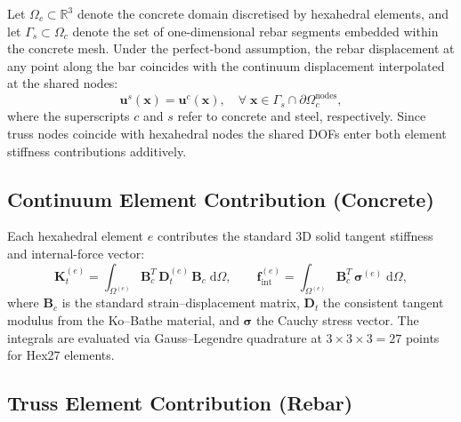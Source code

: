 Let $\Omega_c \subset \mathbb{R}^3$ denote the concrete domain
discretised by hexahedral elements, and let $\Gamma_s \subset \Omega_c$
denote the set of one-dimensional rebar segments embedded within the
concrete mesh.  Under the perfect-bond assumption, the rebar
displacement at any point along the bar coincides with the continuum
displacement interpolated at the shared nodes:
\begin{equation}
  \label{eq:perfect-bond}
  \mathbf{u}^s(\mathbf{x}) = \mathbf{u}^c(\mathbf{x}), \quad
  \forall\; \mathbf{x} \in \Gamma_s \cap \partial\Omega_c^{\text{nodes}},
\end{equation}
where the superscripts $c$ and $s$ refer to concrete and steel,
respectively.  Since truss nodes coincide with hexahedral nodes the
shared DOFs enter both element stiffness contributions additively.

\subsection{Continuum Element Contribution (Concrete)}

Each hexahedral element $e$ contributes the standard 3D solid tangent
stiffness and internal-force vector:
\begin{equation}
  \label{eq:hex-Kt}
  \mathbf{K}_t^{(e)} = \int_{\Omega^{(e)}}
    \mathbf{B}_c^T \, \mathbf{D}_t^{(e)} \, \mathbf{B}_c \; \mathrm{d}\Omega,
  \qquad
  \mathbf{f}_{\text{int}}^{(e)} = \int_{\Omega^{(e)}}
    \mathbf{B}_c^T \, \boldsymbol{\sigma}^{(e)} \; \mathrm{d}\Omega,
\end{equation}
where $\mathbf{B}_c$ is the standard strain--displacement matrix,
$\mathbf{D}_t$ the consistent tangent modulus from the Ko--Bathe
material, and $\boldsymbol{\sigma}$ the Cauchy stress vector.  The
integrals are evaluated via Gauss--Legendre quadrature at
$3 \times 3 \times 3 = 27$ points for Hex27 elements.

\subsection{Truss Element Contribution (Rebar)}

